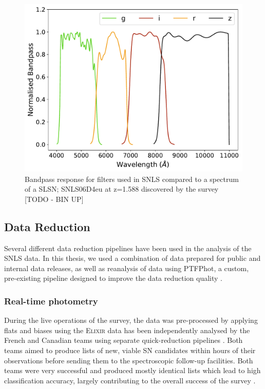 \begin{figure}
  \centering
  \includegraphics[scale=0.8]{Figures/Chapter2/SNLS_filters.pdf}
	\caption{Bandpass response for filters used in SNLS compared to a spectrum of a SLSN; SNLS06D4eu at z=1.588 discovered by the survey [TODO - BIN UP]}
    \label{fig:SNLSFilters}
\end{figure}

\subsection{Data Reduction}
Several different data reduction pipelines have been used in the analysis of the SNLS data. In this thesis, we used a combination of data prepared for public and internal data releases, as well as reanalysis of data using PTFPhot, a custom, pre-existing pipeline designed to improve the data reduction quality \citep{Firth2015}.

\subsubsection{Real-time photometry}
During the live operations of the survey, the data was pre-processed by applying flats and biases using the \textsc{Elixir} \citep{Magnier2004} data has been independently analysed by the French and Canadian teams using separate quick-reduction pipelines \citep{Astier2006,Bazin2011}. Both teams aimed to produce lists of new, viable SN candidates within hours of their observations before sending them to the spectroscopic follow-up facilities. Both teams were very successful and produced mostly identical lists which lead to high classification accuracy, largely contributing to the overall success of the survey \citep{Pritchet2004}.
% 
% 

